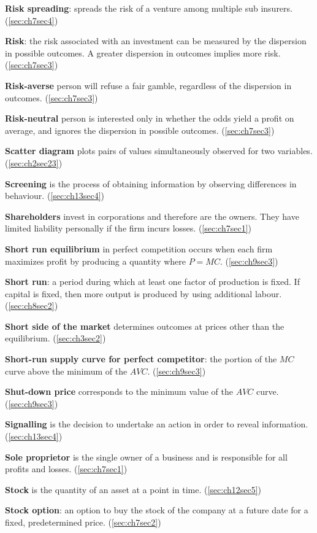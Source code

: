 \textbf{Risk spreading}: spreads the risk of a venture among multiple sub insurers. (\ref{sec:ch7sec4})

\textbf{Risk}: the risk associated with an investment can be measured by the dispersion in possible outcomes. A greater dispersion in outcomes implies more risk. (\ref{sec:ch7sec3})

\textbf{Risk-averse} person will refuse a fair gamble, regardless of the dispersion in outcomes. (\ref{sec:ch7sec3})

\textbf{Risk-neutral} person is interested only in whether the odds yield a profit on average, and ignores the dispersion in possible outcomes. (\ref{sec:ch7sec3})

\textbf{Scatter diagram} plots pairs of values simultaneously observed for two variables. (\ref{sec:ch2sec23})

\textbf{Screening} is the process of obtaining information by observing differences in behaviour. (\ref{sec:ch13sec4})

\textbf{Shareholders} invest in corporations and therefore are the owners. They have limited liability personally if the firm incurs losses. (\ref{sec:ch7sec1})

\textbf{Short run equilibrium} in perfect competition occurs when each firm maximizes profit by producing a quantity where $P = MC$. (\ref{sec:ch9sec3})

\textbf{Short run}: a period during which at least one factor of production is fixed. If capital is fixed, then more output is produced by using additional labour. (\ref{sec:ch8sec2})

\textbf{Short side of the market} determines outcomes at prices other than the equilibrium. (\ref{sec:ch3sec2})

\textbf{Short-run supply curve for perfect competitor}: the portion of the $MC$ curve above the minimum of the $AVC$. (\ref{sec:ch9sec3})

\textbf{Shut-down price} corresponds to the minimum value of the $AVC$ curve. (\ref{sec:ch9sec3})

\textbf{Signalling} is the decision to undertake an action in order to reveal information. (\ref{sec:ch13sec4})

\textbf{Sole proprietor} is the single owner of a business and is responsible for all profits and losses. (\ref{sec:ch7sec1})

\textbf{Stock} is the quantity of an asset at a point in time. (\ref{sec:ch12sec5})

\textbf{Stock option}: an option to buy the stock of the company at a future date for a fixed, predetermined price. (\ref{sec:ch7sec2})

